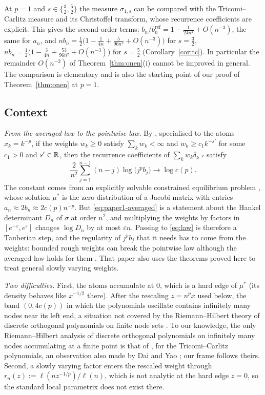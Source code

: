 \begin{remark}[Second order at $p=1$]\label{rem:tc-intro}
At $p=1$ and $s\in\{\frac32,\frac52\}$ the measure $\sigma_{1,s}$ can be compared with the Tricomi--Carlitz measure and
its Christoffel transform, whose recurrence coefficients are explicit. This gives the second-order terms:
$b_n/b_n^{\mathrm{ref}}=1-\frac1{24n^2}+O(n^{-3})$, the same for $a_n$, and
$nb_n=\frac12\bigl(1-\frac1{4n}+\frac5{96n^2}+O(n^{-3})\bigr)$ for $s=\frac32$,
$nb_n=\frac12\bigl(1-\frac3{4n}+\frac{53}{96n^2}+O(n^{-3})\bigr)$ for $s=\frac52$ (Corollary~\ref{cor:tc}). In
particular the remainder $O(n^{-2})$ of Theorem~\ref{thm:onen}(i) cannot be improved in general. The comparison is
elementary and is also the starting point of our proof of Theorem~\ref{thm:onen} at $p=1$.
\end{remark}

\subsection{Context}\label{sec:context}
\emph{From the averaged law to the pointwise law.} By \cite[Corollary~1.2]{Paper1}, specialised to the atoms
$x_k=k^{-p}$, if the weights $w_k\ge0$ satisfy $\sum_kw_k<\infty$ and $w_k\ge c_1k^{-s'}$ for some $c_1>0$ and
$s'\in\mathbb{R}$, then the recurrence coefficients of $\sum_kw_k\delta_{k^{-p}}$ satisfy
\begin{equation}\label{eq:paper1-averaged}
  \frac{2}{n^2}\sum_{j=1}^{n-1}(n-j)\log\bigl(j^pb_j\bigr)\longrightarrow\log c(p).
\end{equation}
The constant comes from an explicitly solvable constrained equilibrium problem \cite[Theorem~1.3]{Paper1}, whose
solution $\mu^*$ is the zero distribution of a Jacobi matrix with entries $a_n\approx2b_n\approx2c(p)n^{-p}$. But
\eqref{eq:paper1-averaged} is a statement about the Hankel determinant $D_n$ of $\sigma$ at order $n^2$, and multiplying
the weights by factors in $[e^{-\varepsilon},e^{\varepsilon}]$ changes $\log D_n$ by at most $\varepsilon n$. Passing to
\eqref{eq:law} is therefore a Tauberian step, and the regularity of $j^pb_j$ that it needs has to come from the weights:
bounded rough weights can break the pointwise law although the averaged law holds for them \cite{Paper3}. That paper
also uses the theorems proved here to treat general slowly varying weights.

\emph{Two difficulties.} First, the atoms accumulate at $0$, which is a hard edge of $\mu^*$ (its density behaves like
$x^{-1/2}$ there). After the rescaling $z=n^px$ used below, the band $(0,4c(p))$ in which the polynomials oscillate
contains infinitely many nodes near its left end, a situation not covered by the Riemann--Hilbert theory of discrete
orthogonal polynomials on finite node sets \cite{BKMM}. To our knowledge, the only Riemann--Hilbert analysis of discrete
orthogonal polynomials on infinitely many nodes accumulating at a finite point is that of \cite{WLXZ}, for the
Tricomi--Carlitz polynomials, an observation also made by Dai and Yao \cite[\S1]{DY}; our frame follows theirs. Second,
a slowly varying factor enters the rescaled weight through $r_n(z):=\ell(nz^{-1/p})/\ell(n)$, which is not analytic at
the hard edge $z=0$, so the standard local parametrix does not exist there.

